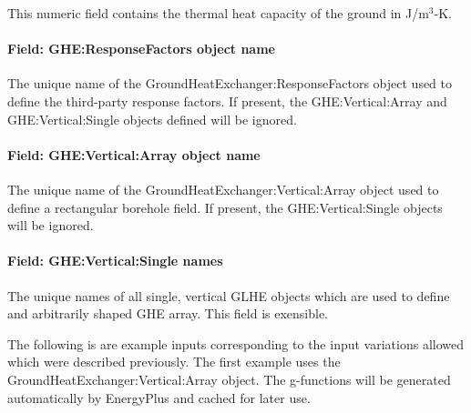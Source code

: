 This numeric field contains the thermal heat capacity of the ground in J/m\(^{3}\)-K.

\paragraph{Field: GHE:ResponseFactors object name}

The unique name of the GroundHeatExchanger:ResponseFactors object used to define the third-party response factors. If present, the GHE:Vertical:Array and GHE:Vertical:Single objects defined will be ignored.

\paragraph{Field: GHE:Vertical:Array object name}

The unique name of the GroundHeatExchanger:Vertical:Array object used to define a rectangular borehole field. If present, the GHE:Vertical:Single objects will be ignored.

\paragraph{Field: GHE:Vertical:Single names}

The unique names of all single, vertical GLHE objects which are used to define and arbitrarily shaped GHE array. This field is exensible.

The following is are example inputs corresponding to the input variations allowed which were described previously. The first example uses the GroundHeatExchanger:Vertical:Array object. The g-functions will be generated automatically by EnergyPlus and cached for later use.

